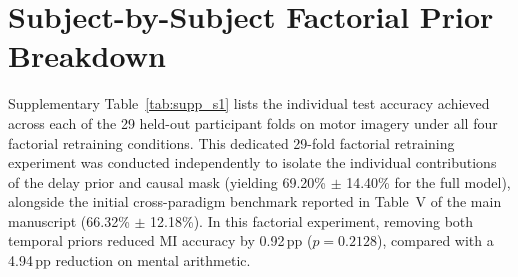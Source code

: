 \documentclass[journal]{IEEEtran}
\begin{document}
\section{Subject-by-Subject Factorial Prior Breakdown}
\label{sec:supp_breakdown}

Supplementary Table~\ref{tab:supp_s1} lists the individual test accuracy achieved across each of the 29 held-out participant folds on motor imagery under all four factorial retraining conditions. This dedicated 29-fold factorial retraining experiment was conducted independently to isolate the individual contributions of the delay prior and causal mask (yielding 69.20\% $\pm$ 14.40\% for the full model), alongside the initial cross-paradigm benchmark reported in Table~V of the main manuscript (66.32\% $\pm$ 12.18\%). In this factorial experiment, removing both temporal priors reduced MI accuracy by 0.92\,pp ($p = 0.2128$), compared with a 4.94\,pp reduction on mental arithmetic.
\end{document}
